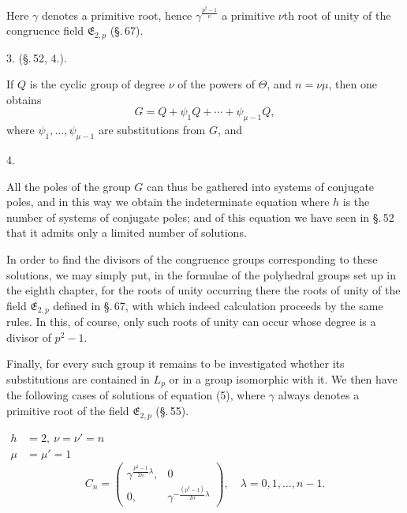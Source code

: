 Here $\gamma$ denotes a primitive root, hence $\gamma^{\frac{p^2-1}{\nu}}$
a primitive $\nu$th root of unity of the congruence field
$\mathfrak{E}_{2,p}$ (\S.\,67).

3. 
(\S.\,52, 4.).

If $Q$ is the cyclic group of degree $\nu$ of the powers
of $\Theta$, and $n = \nu\mu$, then one obtains
\[
G = Q + \psi_1 Q + \cdots + \psi_{\mu-1} Q,
\]
where $\psi_1, \ldots, \psi_{\mu-1}$ are substitutions from $G$, and

4. 

All the poles of the group $G$ can thus be gathered into systems
of conjugate poles, and in this way we obtain the indeterminate
equation
where $h$ is the number of systems of conjugate poles; and of this
equation we have seen in \S.\,52 that it admits only a limited
number of solutions.

In order to find the divisors of the congruence groups corresponding
to these solutions, we may simply put, in the formulae of the
polyhedral groups set up in the eighth chapter, for the roots of
unity occurring there the roots of unity of the field
$\mathfrak{E}_{2,p}$ defined in \S.\,67, with which indeed
calculation proceeds by the same rules. In this, of course, only such
roots of unity can occur whose degree is a divisor of $p^2 - 1$.

Finally, for every such group it remains to be investigated whether
its substitutions are contained in $L_p$ or in a group isomorphic
with it. We then have the following cases of solutions of
equation (5), where $\gamma$ always denotes a primitive root of the field
$\mathfrak{E}_{2,p}$ (\S.\,55).

\quad
$\begin{aligned} h &= 2,\ \nu = \nu' = n \\ \mu &= \mu' = 1 \end{aligned}$
\[
C_n = \begin{pmatrix} \gamma^{\frac{p^2-1}{2n}\lambda}, & 0 \\[2pt] 0, & \gamma^{-\frac{(p^2-1)}{2n}\lambda} \end{pmatrix},
\quad \lambda = 0, 1, \ldots, n-1.
\]
